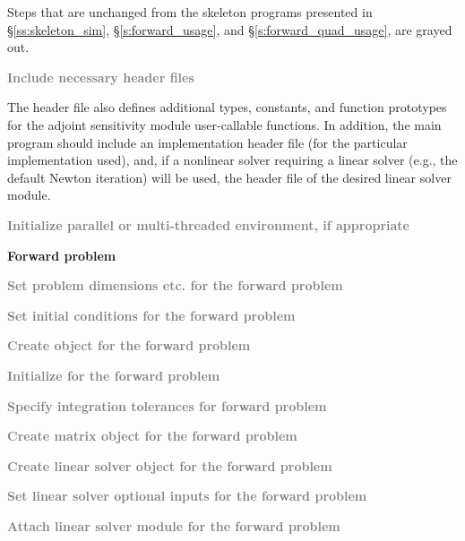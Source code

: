 Steps that are unchanged from the skeleton programs presented in
\S\ref{ss:skeleton_sim}, \S\ref{s:forward_usage}, and
\S\ref{s:forward_quad_usage}, are grayed out.

\begin{Steps}

\item
  \textcolor{gray}{\bf Include necessary header files}

  The  header file also defines additional types, constants, and
  function prototypes for the adjoint sensitivity module user-callable functions.
  In addition, the main program should include an {\nvector} implementation
  header file (for the particular implementation used), and, if a nonlinear
  solver requiring a linear solver (e.g., the default Newton iteration) will be
  used, the header file of the desired linear solver module.

\item
  \textcolor{gray}{\bf Initialize parallel or multi-threaded environment,
  if appropriate}

  \vspace{0.2in}\centerline{\bf Forward problem}

\item
  \textcolor{gray}{\bf Set problem dimensions etc. for the forward problem}

\item
  \textcolor{gray}{\bf Set initial conditions for the forward problem}

\item
  \textcolor{gray}{\bf Create {\cvodes} object for the forward problem}

\item
  \textcolor{gray}{\bf Initialize {\cvodes} for the forward problem}

\item
  \textcolor{gray}{\bf Specify integration tolerances for forward problem}

\item
  \textcolor{gray}{\bf Create matrix object for the forward problem}

\item
  \textcolor{gray}{\bf Create linear solver object for the forward problem}

\item
  \textcolor{gray}{\bf Set linear solver optional inputs for the forward problem}

\item
  \textcolor{gray}{\bf Attach linear solver module for the forward problem}


\end{Steps}
